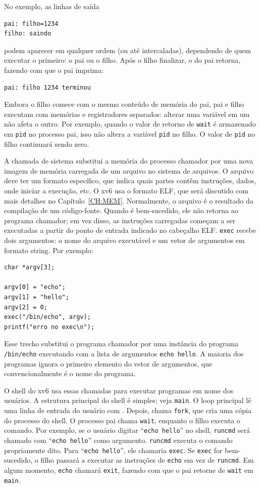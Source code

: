 No exemplo, as linhas de saída
\begin{lstlisting}[]
pai: filho=1234
filho: saindo
\end{lstlisting}
podem aparecer em qualquer ordem (ou até intercaladas), dependendo de quem
executar o  primeiro: o pai ou o filho.
Após o filho finalizar, o  do pai retorna, fazendo com que o pai imprima:
\begin{lstlisting}[]
pai: filho 1234 terminou
\end{lstlisting}
Embora o filho comece com o mesmo conteúdo de memória do pai,
pai e filho executam com memórias e registradores separados:
alterar uma variável em um não afeta o outro. Por exemplo, quando o valor de retorno de
\lstinline{wait}
é armazenado em
\lstinline{pid}
no processo pai,
isso não altera a variável
\lstinline{pid}
no filho. O valor de
\lstinline{pid}
no filho continuará sendo zero.

A chamada de sistema
substitui a memória do processo chamador por uma nova imagem
de memória carregada de um arquivo no sistema de arquivos.
O arquivo deve ter um formato específico, que indica quais partes contêm instruções,
dados, onde iniciar a execução, etc.
O xv6 usa o formato ELF, que será discutido com mais detalhes no Capítulo~\ref{CH:MEM}.
Normalmente, o arquivo é o resultado da compilação de um código-fonte.
Quando
é bem-sucedido, ele não retorna ao programa chamador;
em vez disso, as instruções carregadas começam a ser executadas a partir do ponto de entrada
indicado no cabeçalho ELF.
\lstinline{exec}
recebe dois argumentos: o nome do arquivo executável e um vetor de argumentos em formato string.
Por exemplo:
\begin{lstlisting}[]
char *argv[3];

argv[0] = "echo";
argv[1] = "hello";
argv[2] = 0;
exec("/bin/echo", argv);
printf("erro no exec\n");
\end{lstlisting}
Esse trecho substitui o programa chamador por uma instância
do programa 
\lstinline{/bin/echo}
executando com a lista de argumentos
\lstinline{echo hello}.
A maioria dos programas ignora o primeiro elemento do vetor de argumentos, que
convencionalmente é o nome do programa.

O shell do xv6 usa essas chamadas para executar programas em nome dos
usuários. A estrutura principal do shell é simples; veja
\lstinline{main}.
O loop principal lê uma linha de entrada do usuário com
.
Depois, chama
\lstinline{fork},
que cria uma cópia do processo do shell.
O processo pai chama
\lstinline{wait},
enquanto o filho executa o comando. Por exemplo, se o usuário digitar
``\lstinline{echo hello}''
no shell,
\lstinline{runcmd}
será chamado com
``\lstinline{echo hello}''
como argumento.
\lstinline{runcmd}
executa o comando propriamente dito. Para
``\lstinline{echo hello}'',
ele chamaria
\lstinline{exec}.
Se
\lstinline{exec}
for bem-sucedido, o filho passará a executar as instruções de
\lstinline{echo}
em vez de
\lstinline{runcmd}.
Em algum momento,
\lstinline{echo}
chamará
\lstinline{exit},
fazendo com que o pai retorne de
\lstinline{wait}
em
\lstinline{main}.

